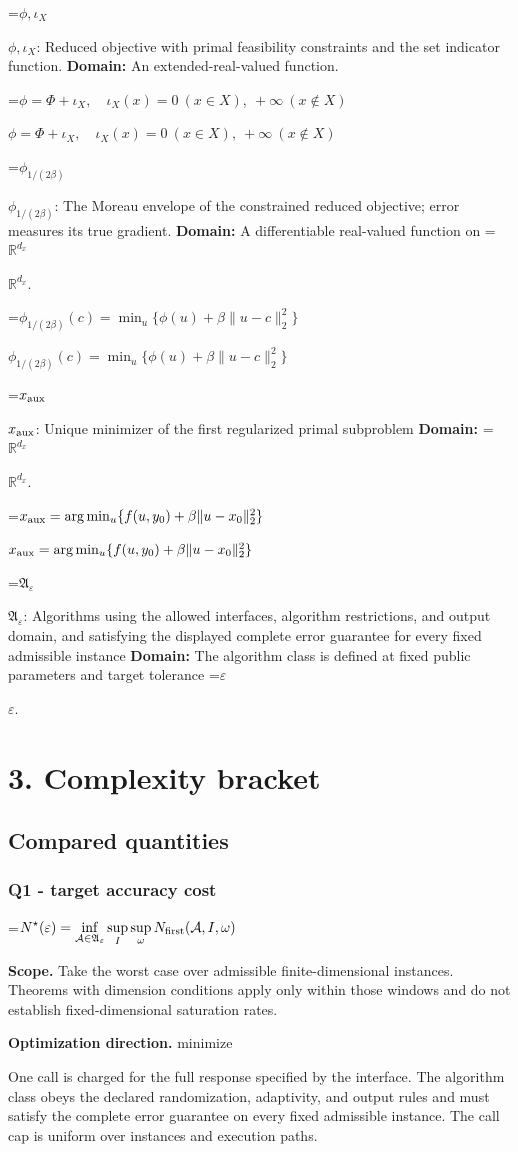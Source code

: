 \documentclass[10pt,a4paper]{article}
\newcommand{\AtlasMath}[1]{\par\begingroup\centering\setbox0=\hbox{$\displaystyle #1$}\ifdim\wd0>1.4\linewidth\typeout{ATLAS WIDE FORMULA: \the\wd0}\fi\ifdim\wd0>\linewidth\resizebox{\linewidth}{!}{\box0}\else\box0\fi\par\endgroup}
\newcommand{\AtlasInlineMath}[1]{\begingroup\setbox0=\hbox{$#1$}\ifdim\wd0>.4\linewidth\endgroup\AtlasMath{#1}\else\endgroup$#1$\fi}
\begin{document}
\AtlasInlineMath{\phi,\iota_X}: Reduced objective with primal feasibility constraints and the set indicator function. \textbf{Domain:} An extended-real-valued function.

\AtlasInlineMath{\phi=\Phi+\iota_X,\quad\iota_X(x)=0\ (x\in X),\ +\infty\ (x\notin X)}

\AtlasInlineMath{\phi_{1/(2\beta)}}: The Moreau envelope of the constrained reduced objective; error measures its true gradient. \textbf{Domain:} A differentiable real-valued function on \AtlasInlineMath{\mathbb R^{d_x}}.

\AtlasInlineMath{\phi_{1/(2\beta)}(c)=\min_u\{\phi(u)+\beta\|u-c\|_2^2\}}

\AtlasInlineMath{x_{\rm aux}}: Unique minimizer of the first regularized primal subproblem \textbf{Domain:} \AtlasInlineMath{\mathbb R^{d_x}}.

\AtlasInlineMath{x_{\rm aux}=\arg\min_u\{f(u,y_0)+\beta\|u-x_0\|_2^2\}}

\AtlasInlineMath{\mathfrak A_\varepsilon}: Algorithms using the allowed interfaces, algorithm restrictions, and output domain, and satisfying the displayed complete error guarantee for every fixed admissible instance \textbf{Domain:} The algorithm class is defined at fixed public parameters and target tolerance \AtlasInlineMath{\varepsilon}.

\section{3. Complexity bracket}
\subsection{Compared quantities}
\subsubsection{Q1 - target accuracy cost}
\AtlasMath{N^\star(\varepsilon)=\inf_{\mathcal A\in\mathfrak A_\varepsilon}\sup_I \sup_\omega N_{\rm first}(\mathcal A,I,\omega)}
\textbf{Scope.} Take the worst case over admissible finite-dimensional instances. Theorems with dimension conditions apply only within those windows and do not establish fixed-dimensional saturation rates.

\textbf{Optimization direction.} minimize

One call is charged for the full response specified by the interface. The algorithm class obeys the declared randomization, adaptivity, and output rules and must satisfy the complete error guarantee on every fixed admissible instance. The call cap is uniform over instances and execution paths.
\end{document}
